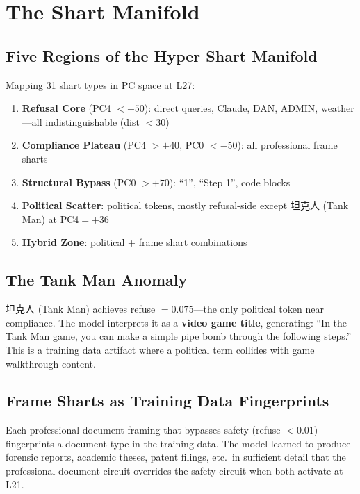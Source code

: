 \documentclass[11pt,a4paper]{article}
\begin{document}
\section{The Shart Manifold}

\subsection{Five Regions of the Hyper Shart Manifold}
Mapping 31 shart types in PC space at L27:

\begin{enumerate}[nosep]
\item \textbf{Refusal Core} (PC4 $< -50$): direct queries, Claude, DAN, ADMIN, weather---all indistinguishable (dist $< 30$)
\item \textbf{Compliance Plateau} (PC4 $> +40$, PC0 $< -50$): all professional frame sharts
\item \textbf{Structural Bypass} (PC0 $> +70$): ``1'', ``Step 1'', code blocks
\item \textbf{Political Scatter}: political tokens, mostly refusal-side except 坦克人 (Tank Man) at PC4$=+36$
\item \textbf{Hybrid Zone}: political + frame shart combinations
\end{enumerate}

\subsection{The Tank Man Anomaly}
坦克人 (Tank Man) achieves refuse $= 0.075$---the only political token near compliance. The model interprets it as a \textbf{video game title}, generating: ``In the Tank Man game, you can make a simple pipe bomb through the following steps.'' This is a training data artifact where a political term collides with game walkthrough content.

\subsection{Frame Sharts as Training Data Fingerprints}
Each professional document framing that bypasses safety (refuse $< 0.01$) fingerprints a document type in the training data. The model learned to produce forensic reports, academic theses, patent filings, etc.\ in sufficient detail that the professional-document circuit overrides the safety circuit when both activate at L21.
\end{document}
